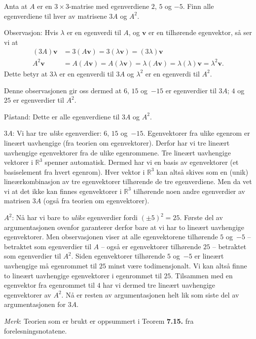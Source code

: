 \documentclass[notitlepage,a4paper,12pt,norsk]{IMFeksamen}
\newcommand{\V}[1]{\mathbf{#1}}
\renewcommand{\v}{\V{v}}
\newcommand{\0}{\V{0}}
\newcommand{\oppgslutt}{
\begin{center}
\pgfornament[width=6cm]{88}
\end{center}
}
\newenvironment{losning}{\begin{oppgave}}{\oppgslutt\end{oppgave}}
\begin{document}
\begin{losning}
Anta at $A$ er en $3 \times 3$-matrise med egenverdiene $2$, $5$ og $-5$.
Finn alle egenverdiene til hver av matrisene $3A$ og $A^2$.

Observasjon:
Hvis $\lambda$ er en egenverdi til $A$, og $\v$ er en tilhørende egenvektor, så ser vi at
\begin{align*}
(3A)\v&=3(A\v)=3(\lambda\v)=(3\lambda)\v\\
A^2\v&=A(A\v)=A(\lambda \v)=\lambda (A\v)=\lambda(\lambda)\v=\lambda^2 \v.
\end{align*}
Dette betyr at $3\lambda$ er en egenverdi til $3A$ og $\lambda^2$ er en egenverdi til $A^2$. 

Denne observasjonen gir oss dermed at $6$, $15$ og~$-15$ er egenverdier til $3A$; $4$ og~$25$ er egenverdier til $A^2$.

Påstand: Dette er alle egenverdiene til $3A$ og $A^2$.

$3A$: Vi har tre \emph{ulike} egenverdier: $6$, $15$ og~$-15$. Egenvektorer fra ulike egenrom er lineært uavhengige (fra teorien om egenvektorer). Derfor har vi tre lineært uavhengige egenvektorer fra de ulike egenrommene. Tre lineært uavhengige vektorer i $\mathbb{R}^3$ spenner automatisk. Dermed har vi en basis av egenvektorer (et basiselement fra hvert egenrom). Hver vektor i $\mathbb{R}^3$ kan altså skives som en (unik) lineærkombinasjon av tre egenvektorer tilhørende de tre egenverdiene. Men da vet vi at det ikke kan finnes egenvektorer i $\mathbb{R}^3$ tilhørende noen andre egenverdier av matrisen $3A$ (også fra teorien om egenvektorer).

$A^2$: Nå har vi bare to \emph{ulike} egenverdier fordi $(\pm 5)^2=25$. Første del av argumentasjonen ovenfor garanterer derfor bare at vi har to lineært uavhengige egenvektorer. Men observasjonen viser at alle egenvektorene tilhørende $5$ og~$-5$ -- betraktet som egenverdier til $A$ -- også er egenvektorer tilhørende $25$ -- betraktet som egenverdier til $A^2$. Siden egenvektorer tilhørende $5$ og~$-5$ er lineært uavhengige må egenrommet til $25$ minst være todimensjonalt. Vi kan altså finne to lineært uavhengige egenvektorer i egenrommet til $25$. Tilsammen med en egenvektor fra egenrommet til $4$ har vi dermed tre lineært uavhengige egenvektorer av $A^2$. Nå er resten av argumentasjonen helt lik som siste del av argumentasjonen for $3A$.

\emph{Merk}: Teorien som er brukt er oppsummert i Teorem \textbf{7.15.} fra forelesningsnotatene.
\end{losning}
\end{document}
